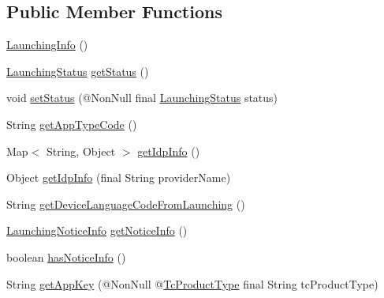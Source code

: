 \subsection*{Public Member Functions}
\begin{DoxyCompactItemize}
\item 
\hyperlink{classcom_1_1toast_1_1android_1_1gamebase_1_1launching_1_1data_1_1_launching_info_a54a98e9d898e08dc8146e51c629aafc5}{Launching\+Info} ()
\item 
\hyperlink{classcom_1_1toast_1_1android_1_1gamebase_1_1launching_1_1data_1_1_launching_status}{Launching\+Status} \hyperlink{classcom_1_1toast_1_1android_1_1gamebase_1_1launching_1_1data_1_1_launching_info_a8582cbd46fc749961b7d6fdf9806d2e3}{get\+Status} ()
\item 
void \hyperlink{classcom_1_1toast_1_1android_1_1gamebase_1_1launching_1_1data_1_1_launching_info_ace8e2c637942b7ef713c7de556c7d21e}{set\+Status} (@Non\+Null final \hyperlink{classcom_1_1toast_1_1android_1_1gamebase_1_1launching_1_1data_1_1_launching_status}{Launching\+Status} status)
\item 
String \hyperlink{classcom_1_1toast_1_1android_1_1gamebase_1_1launching_1_1data_1_1_launching_info_a609cdcf4ac851eee4c8fb106551b9f26}{get\+App\+Type\+Code} ()
\item 
Map$<$ String, Object $>$ \hyperlink{classcom_1_1toast_1_1android_1_1gamebase_1_1launching_1_1data_1_1_launching_info_a9cb037d1d2fa827d078184ea261040d5}{get\+Idp\+Info} ()
\item 
Object \hyperlink{classcom_1_1toast_1_1android_1_1gamebase_1_1launching_1_1data_1_1_launching_info_ad5c4686805f40096b32162a3665e7652}{get\+Idp\+Info} (final String provider\+Name)
\item 
String \hyperlink{classcom_1_1toast_1_1android_1_1gamebase_1_1launching_1_1data_1_1_launching_info_af81e7959cef48bbc584632bb465c602b}{get\+Device\+Language\+Code\+From\+Launching} ()
\item 
\hyperlink{classcom_1_1toast_1_1android_1_1gamebase_1_1launching_1_1data_1_1_launching_notice_info}{Launching\+Notice\+Info} \hyperlink{classcom_1_1toast_1_1android_1_1gamebase_1_1launching_1_1data_1_1_launching_info_affb8d9ad34899ed21feb199d852fe3aa}{get\+Notice\+Info} ()
\item 
boolean \hyperlink{classcom_1_1toast_1_1android_1_1gamebase_1_1launching_1_1data_1_1_launching_info_ac91ad762db5dcaf305204a290389a477}{has\+Notice\+Info} ()
\item 
String \hyperlink{classcom_1_1toast_1_1android_1_1gamebase_1_1launching_1_1data_1_1_launching_info_a4f0fb2ae4b32c93413fa75c8f0977eb1}{get\+App\+Key} (@Non\+Null @\hyperlink{interfacecom_1_1toast_1_1android_1_1gamebase_1_1launching_1_1data_1_1_launching_info_1_1_tc_product_type}{Tc\+Product\+Type} final String tc\+Product\+Type)

\end{DoxyCompactItemize}
